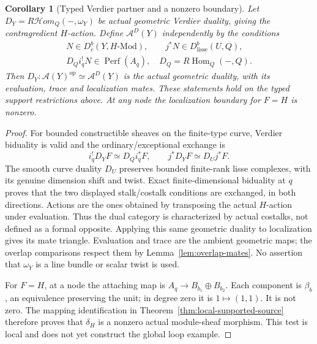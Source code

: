 \documentclass[11pt]{article}
\newtheorem{corollary}[theorem]{Corollary}
\theoremstyle{definition}
\theoremstyle{remark}
\newcommand{\Perf}{\operatorname{Perf}}
\begin{document}
\begin{corollary}[Typed Verdier partner and a nonzero boundary]
\label{cor:local-verdier-boundary}
Let $D_Y=R\mathcal Hom_Q(-,\omega_Y)$ be actual geometric Verdier
duality, giving the contragredient $H$-action.  Define
$\mathcal A^D(Y)$ independently by the conditions
\[
 \begin{gathered}
 N\in D_c^b(Y,H\text{-}\mathrm{Mod}),\qquad
 j^*N\in D^b_{\mathrm{lisse}}(U,Q),\\
 D_Qi_q^!N\in\Perf(A_q),
 \quad D_Q=R\operatorname{Hom}_Q(-,Q).
 \end{gathered}
\]
Then $D_Y:\mathcal A(Y)^{\mathrm{op}}\simeq\mathcal A^D(Y)$
is the actual geometric duality, with its evaluation, trace and
localization mates.  These statements hold on the typed support
restrictions above.  At any node the localization boundary for
$F=H$ is nonzero.
\end{corollary}
\begin{proof}
For bounded constructible sheaves on the finite-type curve,
Verdier biduality is valid and the ordinary/exceptional exchange is
\[
 i_q^!D_YF\simeq D_Q i_q^*F,\qquad
 j^*D_YF\simeq D_Uj^*F.
\]
The smooth curve duality $D_U$ preserves bounded finite-rank lisse
complexes, with its genuine dimension shift and twist.  Exact
finite-dimensional biduality at $q$ proves that the two displayed
stalk/costalk conditions are exchanged, in both directions.  Actions
are the ones obtained by transposing the actual $H$-action under
evaluation.  Thus the dual category is characterized by actual
costalks, not defined as a formal opposite.  Applying this same
geometric duality to localization gives its mate triangle.  Evaluation
and trace are the ambient geometric maps; the overlap comparisons
respect them by Lemma~\ref{lem:overlap-mates}.  No assertion that
$\omega_Y$ is a line bundle or scalar twist is used.

For $F=H$, at a node the attaching map is
$A_q\to B_{b_1}\oplus B_{b_2}$.  Each component is $\beta_b$,
an equivalence preserving the unit; in degree zero it is
$1\mapsto(1,1)$.  It is not zero.  The mapping identification in
Theorem~\ref{thm:local-supported-source} therefore proves that
$\delta_H$ is a nonzero actual module-sheaf morphism.  This test is
local and does not yet construct the global loop example.
\end{proof}
\end{document}
